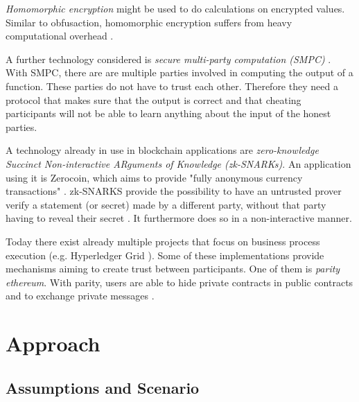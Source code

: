 \documentclass[runningheads]{llncs}
\newcommand{\comment}[1]{}
\begin{document}
\textit{Homomorphic encryption} might be used to do calculations on encrypted values. Similar to obfusaction, homomorphic encryption suffers from heavy computational overhead \cite{gentry2010computing}.


A further technology considered is \textit{secure multi-party computation (SMPC)} \cite{orlandi2011multiparty}. With SMPC, there are are multiple parties involved in computing the output of a function. These parties do not have to trust each other. Therefore they need a protocol that makes sure that the output is correct and that cheating participants will not be able to learn anything about the input of the honest parties. 


A technology already in use in blockchain applications are \textit{zero-knowledge Succinct Non-interactive ARguments of Knowledge (zk-SNARKs)}. An application using it is Zerocoin, which aims to provide "fully anonymous currency transactions" \cite{miers2013zerocoin}. zk-SNARKS provide the possibility to have an untrusted prover verify a statement (or secret) made by a different party, without that party having to reveal their secret \cite{ben2013snarks}. It furthermore does so in a non-interactive manner. 






Today there exist already multiple projects that focus on business process execution (e.g. Hyperledger Grid \cite{hyperledger}). Some of these implementations provide mechanisms aiming to create trust between participants. One of them is \textit{parity ethereum}. With parity, users are able to hide private contracts in public contracts and to exchange private messages \cite{parity}.

\comment{However for private contract execution parity is relying on validators, "account[s] that can allow a private contract’s state [to] change" \cite{parity}. In our understanding this makes parity insufficient for untrusted business execution, since, like private blockchains, it requires trust in one or multiple nodes. 
}




\section{Approach} \label{sec:approach}

\subsection{Assumptions and Scenario} \label{subsec:assumptions}
\end{document}
